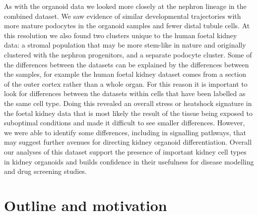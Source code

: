\documentclass[11pt,a4paper,titlepage,twoside,openright]{style/unimelbthesis}
\theoremstyle{definition}
\theoremstyle{definition}
\theoremstyle{definition}
\theoremstyle{remark}
\begin{document}
\begin{mainmatter}
As with the organoid data we looked more closely at the nephron lineage in the combined dataset. We saw evidence of similar developmental trajectories with more mature podocytes in the organoid samples and fewer distal tubule cells. At this resolution we also found two clusters unique to the human foetal kidney data: a stromal population that may be more stem-like in nature and originally clustered with the nephron progenitors, and a separate podocyte cluster. Some of the differences between the datasets can be explained by the differences between the samples, for example the human foetal kidney dataset comes from a section of the outer cortex rather than a whole organ. For this reason it is important to look for differences between the datasets within cells that have been labelled as the same cell type. Doing this revealed an overall stress or heatshock signature in the foetal kidney data that is most likely the result of the tissue being exposed to suboptimal conditions and made it difficult to see smaller differences. However, we were able to identify some differences, including in signalling pathways, that may suggest further avenues for directing kidney organoid differentiation. Overall our analyses of this dataset support the presence of important kidney cell types in kidney organoids and builds confidence in their usefulness for disease modelling and drug screening studies.

\hypertarget{outline-and-motivation}{%
\section{Outline and motivation}\label{outline-and-motivation}}


\end{mainmatter}
\end{document}
